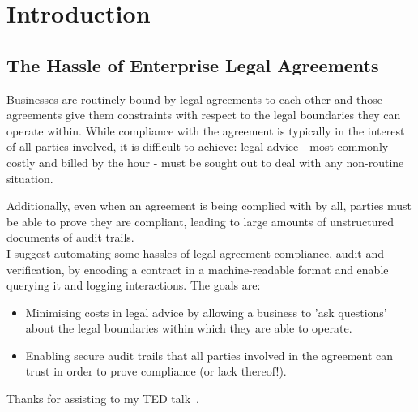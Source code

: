 \chapter{Introduction}\label{ch:introduction}

\section{The Hassle of Enterprise Legal Agreements}\label{sec:intro:legal-hassle}

Businesses are routinely bound by legal agreements to each other and those agreements give them constraints with respect to
the legal boundaries they can operate within.
While compliance with the agreement is typically in the interest of all parties involved, it is difficult
to achieve: legal advice - most commonly costly and billed by the hour - must be sought out to
deal with any non-routine situation.

Additionally, even when an agreement is being complied with by all, parties must be able to prove they are compliant,
leading to large amounts of unstructured documents of audit trails.\\

I suggest automating some hassles of legal agreement compliance, audit and verification, by encoding a contract
in a machine-readable format and enable querying it and logging interactions.
The goals are:
\begin{itemize}
    \item Minimising costs in legal advice by allowing a business to 'ask questions' about the legal boundaries within
    which they are able to operate.
    \item Enabling secure audit trails that all parties involved in the agreement can trust in order to prove
    compliance (or lack thereof!).
\end{itemize}

Thanks for assisting to my TED talk~\citeTODO.
